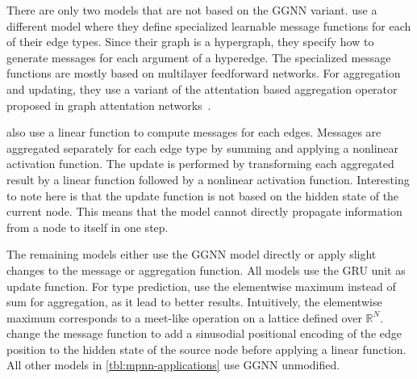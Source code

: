 \documentclass[sigconf,authordraft=true,nonacm=true]{acmart}
\begin{document}
There are only two models that are not based on the GGNN variant.
\citet{wei_lambdanet_2020} use a different model where they define specialized learnable message functions for each of their edge types.
Since their graph is a hypergraph, they specify how to generate messages for each argument of a hyperedge.
The specialized message functions are mostly based on multilayer feedforward networks.
For aggregation and updating, they use a variant of the attentation based aggregation operator proposed in graph attentation networks~\cite{velickovic_graph_2018}.

\citet{si_learning_2018} also use a linear function to compute messages for each edges.
Messages are aggregated separately for each edge type by summing and applying a nonlinear activation function.
The update is performed by transforming each aggregated result by a linear function followed by a nonlinear activation function.
Interesting to note here is that the update function is not based on the hidden state of the current node.
This means that the model cannot directly propagate information from a node to itself in one step.

The remaining models either use the GGNN model directly \cite{allamanis_learning_2018,brauckmann_compiler-based_2020,fernandes_structured_2020,hellendoorn_are_2019,hellendoorn_global_2019,li_using_2019,schrouff_inferring_2019} or apply slight changes to the message or aggregation function.
All models use the GRU unit as update function.
For type prediction, \citet{allamanis_typilus_2020} use the elementwise maximum instead of sum for aggregation, as it lead to better results.
Intuitively, the elementwise maximum corresponds to a meet-like operation on a lattice defined over $\mathbb{R}^{N}$.
\citet{cummins_programl_2020} change the message function to add a sinusodial positional encoding of the edge position to the hidden state of the source node before applying a linear function.
All other models in \cref{tbl:mpnn-applications} use GGNN unmodified.
\end{document}
